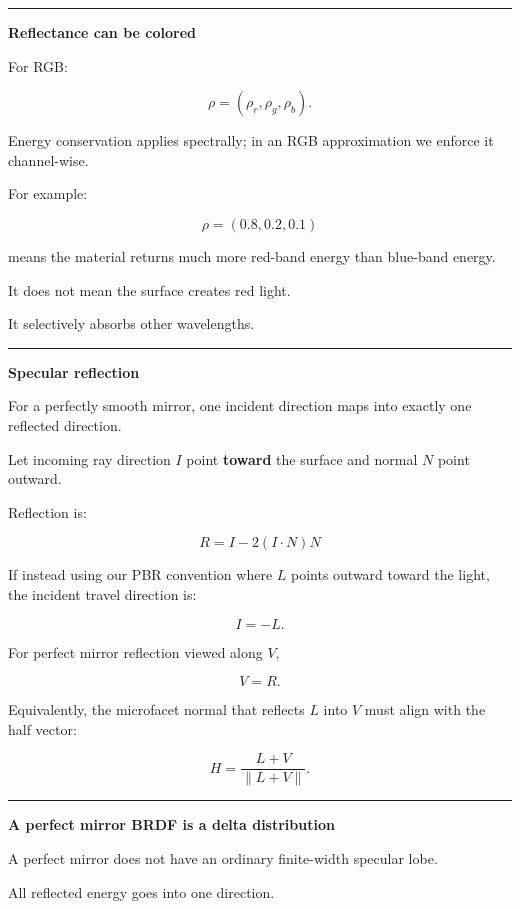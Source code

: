 \begin{center}\rule{0.5\linewidth}{0.5pt}\end{center}

\textbf{Reflectance can be colored}

For RGB:

\[
\rho=
(\rho_r,\rho_g,\rho_b).
\]

Energy conservation applies spectrally; in an RGB approximation we enforce it channel-wise.

For example:

\[
\rho=(0.8,0.2,0.1)
\]

means the material returns much more red-band energy than blue-band energy.

It does not mean the surface creates red light.

It selectively absorbs other wavelengths.

\begin{center}\rule{0.5\linewidth}{0.5pt}\end{center}

\textbf{Specular reflection}

For a perfectly smooth mirror, one incident direction maps into exactly one reflected direction.

Let incoming ray direction \(I\) point \textbf{toward} the surface and normal \(N\) point outward.

Reflection is:

\[
\boxed{
R=
I-2(I\cdot N)N
}
\]

If instead using our PBR convention where \(L\) points outward toward the light, the incident travel direction is:

\[
I=-L.
\]

For perfect mirror reflection viewed along \(V\),

\[
V=R.
\]

Equivalently, the microfacet normal that reflects \(L\) into \(V\) must align with the half vector:

\[
\boxed{
H=
\frac{L+V}{\|L+V\|}.
}
\]

\begin{center}\rule{0.5\linewidth}{0.5pt}\end{center}

\textbf{A perfect mirror BRDF is a delta distribution}

A perfect mirror does not have an ordinary finite-width specular lobe.

All reflected energy goes into one direction.

